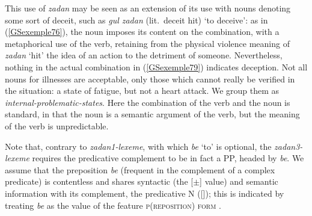 {This use of \emph{zadan} may be seen as an extension of its use with nouns denoting some sort of deceit, such as \emph{gul zadan} (lit.\ deceit hit) `to deceive’: as in (\ref{GSexemple76}), the noun imposes its content on the combination, with a metaphorical use of the verb, retaining from the physical violence meaning of \emph{zadan} `hit’ the idea of an action to the detriment of someone. Nevertheless, nothing in the actual combination in (\ref{GSexemple79}) indicates deception. Not all nouns for illnesses are acceptable, only those which cannot really be verified in the situation: a state of fatigue, but not a heart attack. We group them as \emph{internal-problematic-states}. Here the combination of the verb and the noun is standard, in that the noun is a semantic argument of the verb, but the meaning of the verb is unpredictable.

\begin{exe}
\end{exe}

Note that, contrary to \emph{zadan1-lexeme}, with which \emph{be} `to' is optional, the \emph{zadan3-lexeme} requires the predicative complement to be in fact a PP, headed by \emph{be}. We assume that the preposition \emph{be} (frequent in the complement of a complex predicate) is contentless and shares syntactic (the [\prd $\pm$] value) and semantic information with its complement, the predicative N ([\cont {}]); this is indicated by treating \emph{be} as the value of the feature \textsc{p(reposition) form} \citep[Chapter~3]{ps}.  

}

